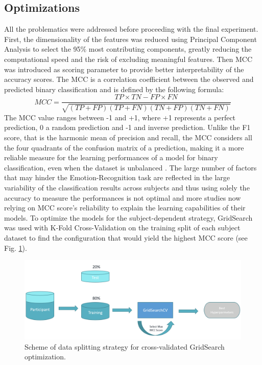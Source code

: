 \subsection{Optimizations}
\label{sec:optimizations}
All the problematics were addressed before proceeding with the final experiment. First, the dimensionality of the features was reduced using Principal Component Analysis to select the 95\% most contributing components, greatly reducing the computational speed and the risk of excluding meaningful features. Then \ac{MCC} \cite{matthews_comparison_1975} was introduced as scoring parameter to provide better interpretability of the accuracy scores. The \ac{MCC} is a correlation coefficient between the observed and predicted binary classification and is defined by the following formula: 
\[MCC = \frac{TP \times TN - FP  \times FN}{\sqrt{(TP + FP)(TP + FN)(TN+ FP)(TN + FN)}}\]
The \ac{MCC} value ranges between -1 and +1, where +1 represents a perfect prediction, 0 a random prediction and -1 and inverse prediction. Unlike the F1 score, that is the harmonic mean of precision and recall, the \ac{MCC} considers all the four quadrants of the confusion matrix of a prediction, making it a more reliable measure for the learning performances of a model for binary classification, even when the dataset is unbalanced \cite{chicco_advantages_2020}. The large number of factors that may hinder the Emotion-Recognition task are reflected in the large variability of the classification results across subjects and thus using solely the accuracy to measure the performances is not optimal and more studies \cite{thammasan_multimodal_2017, keelawat_comparative_2021} now relying on \ac{MCC} score’s reliability to explain the learning capabilities of their models. To optimize the models for the subject-dependent strategy, GridSearch was used with K-Fold Cross-Validation on the training split of each subject dataset to find the configuration that would yield the highest \ac{MCC} score (see Fig. \ref{fig_scheme_data_splitting}). 

\begin{figure}[h!]
\includegraphics[width=12cm]{img/methods/scheme_data_splitting.png}
\centering
\caption{Scheme of data splitting strategy for cross-validated GridSearch optimization.} \label{fig_scheme_data_splitting}
\end{figure}

